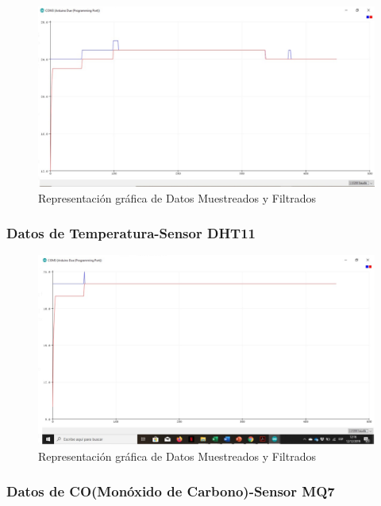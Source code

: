 \documentclass[10pt,a4paper]{article}
\begin{document}
\begin{multicols}{2}
\begin{itemize}
\begin{figure}[H]
\centering
\includegraphics[scale=0.30]{medhumedad.PNG}
\caption{Representación gráfica de Datos Muestreados y Filtrados}
\end{figure}


\subsubsection{Datos de Temperatura-Sensor DHT11}


\begin{figure}[H]
\centering
\includegraphics[scale=0.30]{medtemperatura.PNG}
\caption{Representación gráfica de Datos Muestreados y Filtrados}
\end{figure}


\subsubsection{Datos de CO(Monóxido de Carbono)-Sensor MQ7}


\end{itemize}
\end{multicols}
\end{document}
